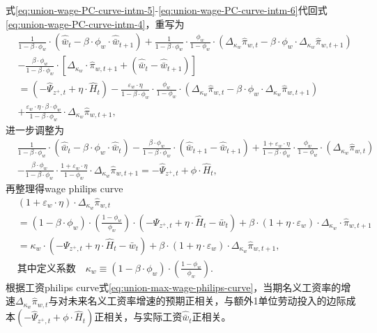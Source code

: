 式\eqref{eq:union-wage-PC-curve-intm-5}-\eqref{eq:union-wage-PC-curve-intm-6}代回式\eqref{eq:union-wage-PC-curve-intm-4}，重写为
\begin{align*}
&\frac{1}{1-\beta \cdot \phi_w} \cdot \left( \hat{\bar{w}}_t - \beta \cdot \phi_w \cdot \hat{\bar{w}}_{t+1}\right)
+ \frac{1}{1-\beta \cdot \phi_w} \cdot \frac{\phi_w}{1-\phi_w} \cdot \left(\Delta_{\kappa_w}\hat{\pi}_{w,t} -\beta \cdot \phi_w \cdot \Delta_{\kappa_w} \hat{\pi}_{w,t+1}\right) \\
&- \frac{\beta \cdot \phi_w }{1-\beta \cdot \phi_w} \cdot \left[
  \Delta_{\kappa_w} \cdot \hat{\pi}_{w,t+1} + \left(\hat{\bar{w}}_t - \hat{\bar{w}}_{t+1}\right)
\right]  \\
&=\left(-\hat{\Psi}_{z^+,t} + \eta \cdot \hat{H}_t\right)
- \frac{\varepsilon_w \cdot \eta }{1-\beta \cdot \phi_w} \cdot  \frac{\phi_w}{1-\phi_w} \cdot \left(\Delta_{\kappa_w} \hat{\pi}_{w,t} - \beta \cdot \phi_w \cdot \Delta_{\kappa_w} \hat{\pi}_{w,t+1}\right) \\
&+\frac{\varepsilon_w \cdot \eta \cdot \beta \cdot \phi_w }{1-\beta \cdot \phi_w} \cdot \Delta_{\kappa_w} \hat{\pi}_{w,t+1},
\end{align*}
进一步调整为
\begin{align*}
&\frac{1}{1-\beta \cdot \phi_w} \cdot \left(\hat{\bar{w}}_t - \beta \cdot \phi_w \cdot \hat{\bar{w}}_t\right)
- \frac{\beta \cdot \phi_w}{1-\beta \cdot \phi_w} \cdot\left(\hat{\bar{w}}_{t+1} - \hat{\bar{w}}_{t+1} \right)
+ \frac{1 + \varepsilon_w \cdot \eta }{1 - \beta \cdot \phi_w} \cdot \frac{\phi_w}{1-\phi_w} \cdot \left( \Delta_{\kappa_w} \hat{\pi}_{w,t} \right) \\
& - \frac{\beta \cdot \phi_w}{1-\beta \cdot \phi_w} \cdot \frac{1 + \varepsilon_w \cdot \eta }{1 -  \phi_w} \cdot \Delta_{\kappa_w} \hat{\pi}_{w,t+1}
= - \hat{\Psi}_{z^+,t} + \phi \cdot \hat{H}_t,
\end{align*}
再整理得wage philips curve
\begin{equation}
\label{eq:union-max-wage-philips-curve}
\begin{split}
  &\left(1+\varepsilon_w \cdot \eta \right) \cdot \Delta_{\kappa_w} \hat{\pi}_{w,t} \\
  &= \left(1-\beta \cdot \phi_w \right) \cdot \left(\frac{1-\phi_w}{\phi_w}\right) \cdot \left( -\Psi_{z^+,t} + \eta \cdot \hat{H}_t - \bar{w}_t \right) + \beta \cdot \left(1+\eta \cdot \varepsilon_w \right) \cdot \Delta_{\kappa_w} \cdot \hat{\pi}_{w,t+1}  \\
  &= \kappa_w \cdot \left(-\Psi_{z^+,t} + \eta \cdot \hat{H}_t - \bar{w}_t\right) + \beta \cdot \left(1+ \eta \cdot \varepsilon_w \right) \cdot \Delta_{\kappa_w} \hat{\pi}_{w,t+1},\\
&\text{其中定义系数} \quad  \kappa_w \equiv  \left(1-\beta \cdot \phi_w \right) \cdot \left(\frac{1-\phi_w}{\phi_w}\right). \end{split}
\end{equation}
根据工资philips curve式\eqref{eq:union-max-wage-philips-curve}，当期名义工资率的增速$\Delta_{\kappa_w}\hat{\pi}_{w,t}$与对未来名义工资率增速的预期正相关，与额外1单位劳动投入的边际成本$\left(-\hat{\Psi}_{z^+,t}+\phi \cdot \hat{H}_t\right)$正相关，与实际工资$\hat{\bar{w}}_t$正相关。




